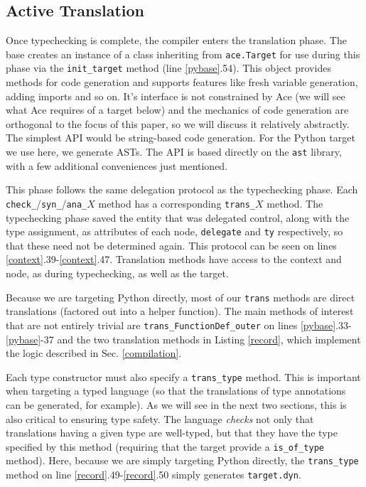 \documentclass[10pt,preprint]{sigplanconf}
\begin{document}
{\subsection{Active Translation}
Once typechecking is complete, the compiler enters the translation phase. The base creates an instance of a class inheriting from \verb|ace.Target| for use during this phase via the \verb|init_target| method (line \ref{pybase}.54). This object provides methods for code generation and supports features like fresh variable generation, adding imports and so on. It's interface is not constrained by Ace (we will see what Ace requires of a target below) and the mechanics of code generation are orthogonal to the  focus of this paper, so we will discuss it relatively abstractly. The simplest API would be string-based code generation. For the Python target we use here, we generate ASTs. The API is based directly on the \verb|ast| library, with a few additional conveniences just mentioned.

This phase follows the same delegation protocol as the typechecking phase. Each \verb|check_|/\verb|syn_|/\verb|ana_|$X$  method has a corresponding \verb|trans_|$X$ method. The typechecking phase saved the entity that was delegated control, along with the type assignment, as attributes of each node, \verb|delegate| and \verb|ty| respectively, so that these need not be determined again. This protocol can be seen on lines \ref{context}.39-\ref{context}.47. 
Translation methods have access to the context and node, as during typechecking, as well as the target. 

Because we are targeting Python directly, most of our \verb|trans| methods are direct translations (factored out into a helper function). The main methods of interest that are not entirely trivial are \verb|trans_FunctionDef_outer| on lines \ref{pybase}.33-\ref{pybase}-37 and the two translation methods in Listing \ref{record}, which implement the logic described in Sec. \ref{compilation}. 

Each type constructor must also specify a \verb|trans_type| method. This is important when targeting a typed language (so that the translations of type annotations can be generated, for example). As we will see in the next two sections, this is also critical to ensuring type safety. The language \emph{checks} not only that translations having a given type are well-typed, but that they have the type specified by this method (requiring that the target provide a \verb|is_of_type| method). Here, because we are simply targeting Python directly, the \verb|trans_type| method on line \ref{record}.49-\ref{record}.50 simply generates \verb|target.dyn|. 

}
\end{document}
